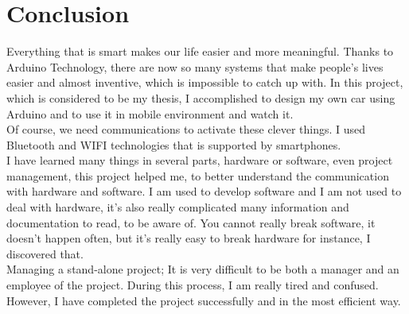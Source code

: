 \documentclass[11pt]{article}
\begin{document}
\section{Conclusion}
\begin{flushleft}
Everything that is smart makes our life easier and more meaningful. Thanks to Arduino Technology, there are now so many systems that make people's lives easier and almost inventive, which is impossible to catch up with. In this project, which is considered to be my thesis, I accomplished to design my own car using Arduino and to use it in mobile environment and watch it.\\
\vspace{0.25cm}
Of course, we need communications to activate these clever things. I used Bluetooth and WIFI technologies that is supported by smartphones.\\
\vspace{0.25cm}
I have learned many things in several parts, hardware or software, even project management, this project helped me, to better understand the communication with hardware and software. I am used to develop software and I am not used to deal with hardware, it’s also really complicated many information and documentation to read, to be aware of. You cannot really break software, it doesn’t happen often, but it’s really easy to break hardware for instance, I discovered that.\\
\vspace{0.25cm}
Managing a stand-alone project; It is very difficult to be both a manager and an employee of the project. During this process, I am really tired and confused. However, I have completed the project successfully and in the most efficient way.
\end{flushleft}

\vspace{0.3cm}

\end{document}

